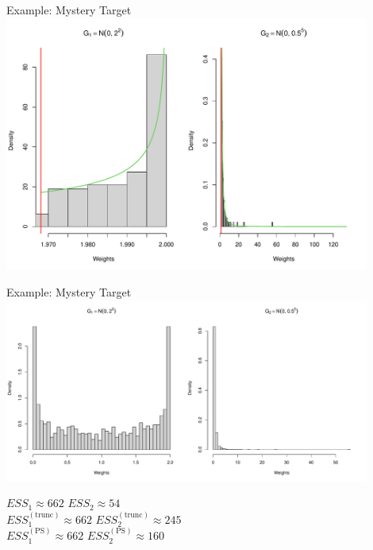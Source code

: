 \documentclass[14pt]{beamer}
\begin{document}
\begin{frame}{Example: Mystery Target}
    \centering
    \includegraphics[height=0.9\textheight, width=0.9\textwidth, keepaspectratio]{Figures/Wt Hist - Pareto Smooth Zoom.pdf}
\end{frame}

\begin{frame}{Example: Mystery Target}
    \centering
    \includegraphics[height=0.5\textheight, width=0.9\textwidth]{Figures/Wt Hist - Pareto Smooth.pdf}\newline
    \begin{outline}
        $ESS_1 \approx 662$ \hspace{2.5cm} $ESS_2 \approx 54$\\
        $ESS_1^{(\mathrm{trunc})} \approx 662$ \hspace{2.5cm} $ESS_2^{(\mathrm{trunc})} \approx 245$\\
        $ESS_1^{(\mathrm{PS})} \approx 662$ \hspace{2.5cm} $ESS_2^{(\mathrm{PS})} \approx 160$
    \end{outline}
\end{frame}
\end{document}
